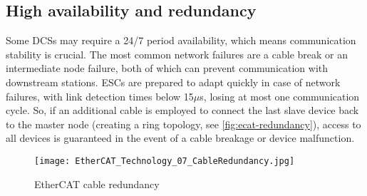 \subsection{High availability and redundancy}

Some DCSs may require a 24/7 period availability, which means communication stability is crucial.
The most common network failures are a cable break or an intermediate node failure, both of which can prevent communication with downstream stations.
ESCs are prepared to adapt quickly in case of network failures, with link detection times below 15$\mu$s, losing at most one communication cycle.
So, if an additional cable is employed to connect the last slave device back to the master node (creating a ring topology, see \autoref{fig:ecat-redundancy}), access to all devices is guaranteed in the event of a cable breakage or device malfunction.

\begin{figure}[t]
	\centering
	\texttt{[image: EtherCAT\_Technology\_07\_CableRedundancy.jpg]}
	\caption{EtherCAT cable redundancy \cite{protocol:ethercat}}
	\label{fig:ecat-redundancy}
\end{figure}


